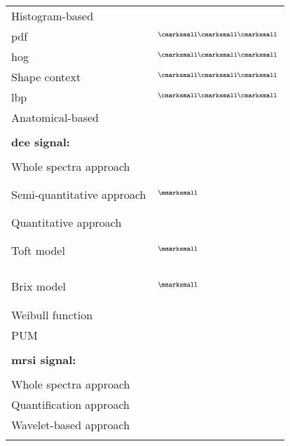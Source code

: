 \begin{table}
\begin{threeparttable}
\begin{tabular}{p{.5\linewidth} p{.4\linewidth}}
      \quad \quad Histogram-based & \\
      \quad \quad \quad \acs{pdf} & $^{\text{{\cmarksmall}{\cmarksmall}{\cmarksmall}}}$\cite{Liu2013} \\
      \quad \quad \quad \acs{hog} & $^{\text{{\cmarksmall}{\cmarksmall}{\cmarksmall}}}$\cite{Liu2013} \\
      \quad \quad \quad Shape context & $^{\text{{\cmarksmall}{\cmarksmall}{\cmarksmall}}}$\cite{Liu2013} \\
      \quad \quad \quad \acs{lbp} & $^{\text{{\cmarksmall}{\cmarksmall}{\cmarksmall}}}$\cite{Liu2013} \\
      \quad \quad Anatomical-based & \cite{Litjens2012,Litjens2014,Matulewicz2013} \\ \\ [-1.5ex]
      \textbf{\ac{dce} signal:} & \\ \\ [-1.5ex]
      \quad Whole spectra approach & \cite{Ampeliotis2007,Ampeliotis2008} \\
      \quad Semi-quantitative approach & $^{\text{{\mmarksmall}}}$\cite{Puech2009}\par \cite{Mazzetti2011,Niaf2011,Niaf2012,Sung2011} \\
      \quad Quantitative approach &  \\
      \quad \quad Toft model & $^{\text{{\mmarksmall}}}$\cite{Liu2013,Peng2009}\par \cite{Giannini2013,Langer2009,Litjens2011,Litjens2012,Litjens2014,Mazzetti2011,Niaf2011,Niaf2012} \\
      \quad \quad Brix model & $^{\text{{\mmarksmall}}}$\cite{Artan2009,Artan2010,Ozer2009,Ozer2010}\par \cite{Liu2009,Sung2011} \\
      \quad \quad Weibull function & \cite{Giannini2013,Mazzetti2011} \\
      \quad \quad PUM & \cite{Giannini2013,Mazzetti2011} \\
      \\ [-1.5ex]
      \textbf{\ac{mrsi} signal:} & \\ \\ [-1.5ex]
      \quad Whole spectra approach & \cite{Kelm2007,Matulewicz2013,Parfait2012,Tiwari2007,Tiwari2008,Tiwari2009,Tiwari2009a,Tiwari2010,Tiwari2013,Viswanath2008} \\
      \quad Quantification approach & \cite{Kelm2007,Parfait2012} \\
      \quad Wavelet-based approach & \cite{Tiwari2012} \\ \\ [-1.5ex]

\end{tabular}
\end{threeparttable}
\end{table}
